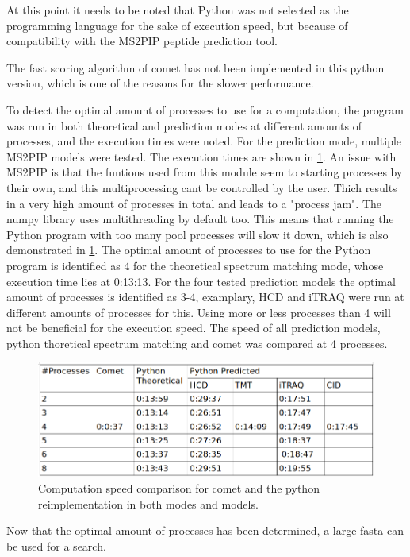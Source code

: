 \documentclass[11pt]{article}
\begin{document}
At this point it needs to be noted that Python was not selected as the programming language for the sake of execution speed, but because of compatibility with the MS2PIP peptide prediction tool.

The fast scoring algorithm of comet has not been implemented in this python version, which is one of the reasons for the slower performance.

To detect the optimal amount of processes to use for a computation, the program was run in both theoretical and prediction modes at different amounts of processes, and the execution times were noted. For the prediction mode, multiple MS2PIP models were tested. The execution times are shown in \cref{fig:speed-comparison}. An issue with MS2PIP is that the funtions used from this module seem to starting processes by their own, and this multiprocessing cant be controlled by the user. Thich results in a very high amount of processes in total and leads to a "process jam". The numpy library uses multithreading by default too. This means that running the Python program with too many pool processes will slow it down, which is also demonstrated in \cref{fig:speed-comparison}. The optimal amount of processes to use for the Python program is identified as 4 for the theoretical spectrum matching mode, whose execution time lies at 0:13:13. For the four tested prediction models the optimal amount of processes is identified as 3-4, examplary, HCD and iTRAQ were run at different amounts of processes for this. Using more or less processes than 4 will not be beneficial for the execution speed. The speed of all prediction models, python thoretical spectrum matching and comet was compared at 4 processes.

\begin{figure}[ht]
\centering
\includegraphics[width=1\textwidth]{figs/speed-comparison.png}
\caption{Computation speed comparison for comet and the python reimplementation in both modes and models.}
\label{fig:speed-comparison}
\end{figure}

Now that the optimal amount of processes has been determined, a large fasta can be used for a search.
\end{document}
